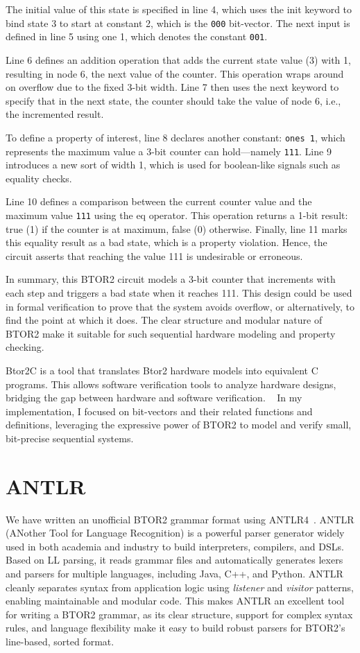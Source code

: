 The initial value of this state is specified in line 4, which uses the init keyword to bind state 3 to start at constant 2, which is the \verb|000| bit-vector. The next input is defined in line 5 using one 1, which denotes the constant \verb|001|.

Line 6 defines an addition operation that adds the current state value (3) with 1, resulting in node 6, the next value of the counter. This operation wraps around on overflow due to the fixed 3-bit width. Line 7 then uses the next keyword to specify that in the next state, the counter should take the value of node 6, i.e., the incremented result.

To define a property of interest, line 8 declares another constant: \verb|ones 1|, which represents the maximum value a 3-bit counter can hold—namely \verb|111|. Line 9 introduces a new sort of width 1, which is used for boolean-like signals such as equality checks.

Line 10 defines a comparison between the current counter value and the maximum value \verb|111| using the eq operator. This operation returns a 1-bit result: true (1) if the counter is at maximum, false (0) otherwise. Finally, line 11 marks this equality result as a bad state, which is a property violation. Hence, the circuit asserts that reaching the value 111 is undesirable or erroneous.

In summary, this BTOR2 circuit models a 3-bit counter that increments with each step and triggers a bad state when it reaches 111. This design could be used in formal verification to prove that the system avoids overflow, or alternatively, to find the point at which it does. The clear structure and modular nature of BTOR2 make it suitable for such sequential hardware modeling and property checking.

Btor2C is a tool that translates Btor2 hardware models into equivalent C programs. This allows software verification tools to analyze hardware designs, bridging the gap between hardware and software verification. ~\cite{btor2c}
In my implementation, I focused on bit-vectors and their related functions and definitions, leveraging the expressive power of BTOR2 to model and verify small, bit-precise sequential systems.

\section{ANTLR}
We have written an unofficial BTOR2 grammar format using ANTLR4~\cite{antlr}.
ANTLR (ANother Tool for Language Recognition) is a powerful parser generator widely used in both academia and industry to build interpreters, compilers, and DSLs. Based on LL parsing, it reads grammar files and automatically generates lexers and parsers for multiple languages, including Java, C++, and Python. ANTLR cleanly separates syntax from application logic using \textit{listener} and \textit{visitor} patterns, enabling maintainable and modular code.
This makes ANTLR an excellent tool for writing a BTOR2 grammar, as its clear structure, support for complex syntax rules, and language flexibility make it easy to build robust parsers for BTOR2's line-based, sorted format.

